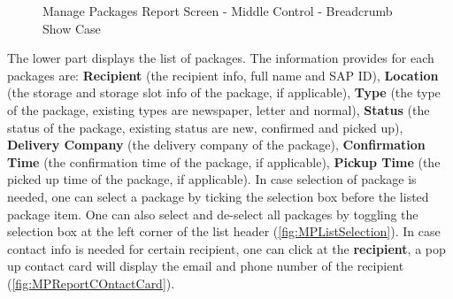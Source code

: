 \begin{figure}[H]
	\centering
	\hspace{5pt}

	\caption{Manage Packages Report Screen - Middle Control - Breadcrumb Show Case}
	\label{fig:MPBreadCrumb}
\end{figure}

The lower part displays the list of packages. The information provides for each packages are: \textbf{Recipient} (the recipient info, full name and SAP ID), \textbf{Location} (the storage and storage slot info of the package, if applicable), \textbf{Type} (the type of the package, existing types are newspaper, letter and normal), \textbf{Status} (the status of the package, existing status are new, confirmed and picked up), \textbf{Delivery Company} (the delivery company of the package), \textbf{Confirmation Time} (the confirmation time of the package, if applicable), \textbf{Pickup Time} (the picked up time of the package, if applicable).
In case selection of package is needed, one can select a package by ticking the selection box before the listed package item. One can also select and de-select all packages by toggling the selection box at the left corner of the list header (\autoref{fig:MPListSelection}).
In case contact info is needed for certain recipient, one can click at the \textbf{recipient}, a pop up contact card will display the email and phone number of the recipient (\autoref{fig:MPReportCOntactCard}).

